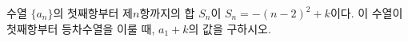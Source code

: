 수열 $\{a_n\}$의 첫째항부터 제$n$항까지의 합 $S_n$이 $S_n=-(n-2)^2+k$이다. 이 수열이 첫째항부터 등차수열을 이룰 때, $a_1+k$의 값을 구하시오. 
